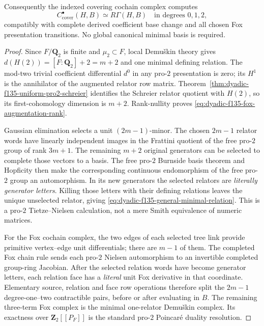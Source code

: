 \begin{theorem}
Consequently the
indexed covering
cochain complex
computes
\begin{equation}\label{eq:dyadic-f135-uniform-schreier-rgamma}
\boxed{\quad
C_{\mathrm{cover}}^\bullet(H,B)
\simeq
R\Gamma(H,B)
\quad\text{in degrees }0,1,2,
\quad}
\end{equation}
compatibly with
complete derived
coefficient base
change and
all chosen
Fox presentation
transitions.
No global canonical
minimal basis is
required.
\end{theorem}

\begin{proof}
Since $F/\mathbf Q_2$
is finite and
$\mu_2\subset F$,
local Demu\v{s}kin
theory
\cite{NSW,LabuteClassification}
gives
$d(H(2))=[F:\mathbf Q_2]+2=m+2$
and one minimal
defining relation.
The mod-two trivial
coefficient differential
$d^0$ in any
pro-$2$ presentation
is zero; its
$H^1$ is the
annihilator of the
augmented relator
row matrix.
Theorem~\ref{thm:dyadic-f135-uniform-pro2-schreier}
identifies the
Schreier relator
quotient with
$H(2)$, so its
first-cohomology
dimension is
$m+2$.
Rank-nullity
proves
\eqref{eq:dyadic-f135-fox-augmentation-rank}.

Gaussian elimination
selects a unit
$(2m-1)$-minor.
The chosen
$2m-1$ relator
words have
linearly independent
images in the
Frattini quotient
of the free
pro-$2$ group
of rank $3m+1$.
The remaining
$m+2$ original
generators can
be selected to
complete those
vectors to a
basis.
The free
pro-$2$ Burnside
basis theorem
and Hopficity
then make the
corresponding
continuous
endomorphism
of the free
pro-$2$ group
an automorphism.
In its new
generators the
selected relators
are \emph{literally
generator letters}.
Killing those
letters with
their defining
relations leaves
the unique
unselected
relator, giving
\eqref{eq:dyadic-f135-general-minimal-relation}.
This is a
pro-$2$
Tietze--Nielsen
calculation, not
a mere Smith
equivalence of
numeric matrices.

For the Fox
cochain complex,
the two edges
of each selected
tree link provide
primitive
vertex--edge
unit differentials;
there are
$m-1$ of them.
The completed
Fox chain rule
sends each
pro-$2$ Nielsen
automorphism
to an invertible
completed
group-ring
Jacobian.
After the
selected relation
words have become
generator letters,
each relation
face has a
\emph{literal}
unit Fox derivative
in that coordinate.
Elementary
source, relation
and face
row operations
therefore split
the $2m-1$
degree-one--two
contractible
pairs, before
or after
evaluating
in $B$.
The remaining
three-term Fox
complex is
the minimal
one-relator
Demu\v{s}kin
complex.
Its exactness
over
$\mathbf Z_2[[P_F]]$
is the standard
pro-$2$
Poincar\'e
duality resolution.


\end{proof}
